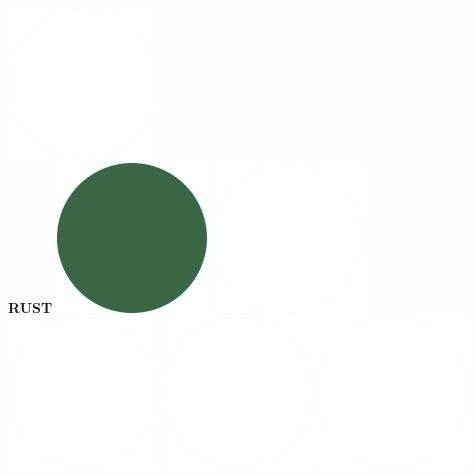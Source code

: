 \documentclass[a4paper]{friggeri-cv_reccius-experiment}
\begin{document}
\begin{aside}
    \includegraphics[scale=0.11]{img/WhiteDots.png}\\
    \belowspace
    \textbf{RUST}\hfill
    \includegraphics[scale=0.11]{img/IPSGreenDots.png}
    \includegraphics[scale=0.11]{img/WhiteDots.png}
    \includegraphics[scale=0.11]{img/WhiteDots.png}
    \includegraphics[scale=0.11]{img/WhiteDots.png}
    \includegraphics[scale=0.11]{img/WhiteDots.png}

\end{aside}
\end{document}
